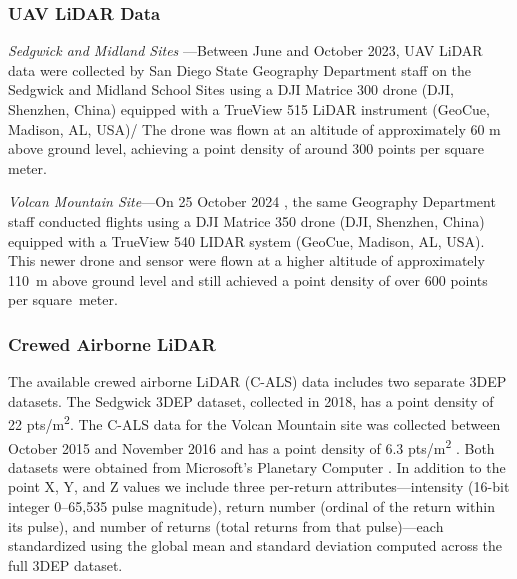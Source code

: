 \documentclass[remotesensing,article,accept,pdftex,moreauthors]{Definitions/mdpi}
\renewcommand{\hl}[1]{#1}
\begin{document}
\subsubsection{UAV LiDAR Data}
\textit{\hl{Sedgwick and Midland Sites}%
}---Between June and October 2023, UAV LiDAR data were collected by San Diego State Geography Department staff on the Sedgwick and Midland School Sites using a DJI Matrice 300 drone (DJI, Shenzhen, China) %
 equipped with a TrueView 515 LiDAR instrument (GeoCue, Madison, AL, USA)/%
The drone was flown at an altitude of approximately 60 m above ground level, achieving a point density of around 300 points per square meter.

\textit{\hl{Volcan Mountain Site}}---On \hl{25 October 2024}%
, the same Geography Department staff conducted flights using a DJI Matrice 350 drone (DJI, Shenzhen, China) equipped with a TrueView 540 LIDAR system (GeoCue, Madison, AL, USA). This newer drone and sensor were flown at a higher altitude of approximately \mbox{110 m} above ground level and still achieved a point density of over 600 points per \mbox{square meter}.

\subsubsection{Crewed Airborne LiDAR}
The available crewed airborne LiDAR (C-ALS) data includes two separate 3DEP datasets. The Sedgwick 3DEP dataset, collected in 2018, has a point density of 22 pts/m\textsuperscript{2}. The C-ALS data for the Volcan Mountain site was collected between October 2015 and November 2016 and has a point density of 6.3 pts/m\textsuperscript{2} \citep{usgs_usgs_2016}. Both datasets were obtained from Microsoft's Planetary Computer \citep{us_geological_survey_3d_elevation_program_usgs_2023,planetary_computer}.
In addition to the point X, Y, and Z values we include three per-return attributes—intensity (16-bit integer 0–65,535 pulse magnitude), return number (ordinal of the return within its pulse), and number of returns (total returns from that pulse)—each standardized using the global mean and standard deviation computed across the full 3DEP dataset.
\end{document}
